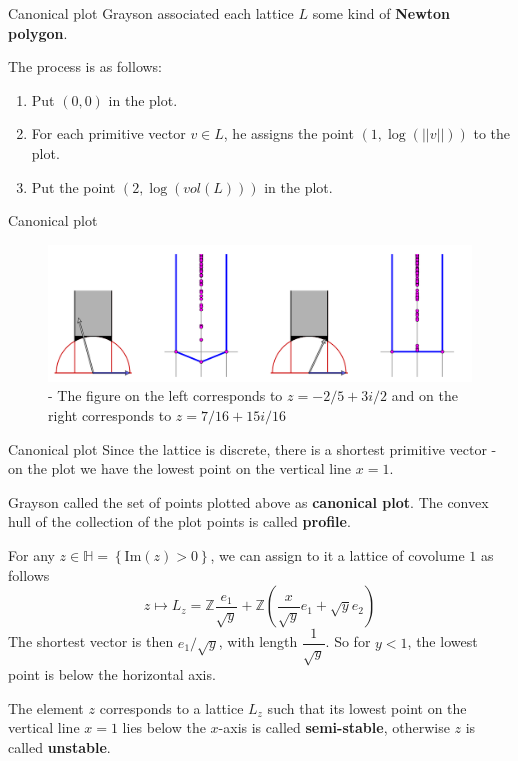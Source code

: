 \documentclass[pdf]{beamer}
\begin{document}
\begin{frame}{Canonical plot}
    Grayson associated each lattice $L$  some kind of \textbf{Newton polygon}. \pause

    The process is as follows:
    \begin{enumerate}
        \item Put $(0,0)$ in the plot.
        \item For each primitive vector $v \in L$, he assigns the point $(1,\log(||v||))$ to the plot.
        \item Put the point $(2,\log(vol(L)))$ in the plot.
    \end{enumerate}
\end{frame}
\begin{frame}{Canonical plot}
    \begin{figure}[h]
        \includegraphics[width = \textwidth]{Canonical plot.png}
        \caption{\cite{casselman2004stability} - The figure on the left corresponds to $z = -2/5 +3i/2$ and on the right corresponds to $z = 7/16+15i/16$ }
    \end{figure}
\end{frame}
\begin{frame}{Canonical plot}
    Since the lattice is discrete, there is a shortest primitive vector - on the plot we have the lowest point on the vertical line $x=1$.\pause\vspace{3em}

    Grayson called the set of points plotted above as \textbf{canonical plot}. The convex hull of the collection
    of the plot points is called \textbf{profile}.
\end{frame}
\begin{frame}
    For any $z \in \mathbb{H} = \left\lbrace \text{Im}(z)>0 \right\rbrace$, we can assign to it a lattice of covolume $1$ as follows
    \[z \mapsto L_z = \mathbb{Z}\dfrac{e_1}{\sqrt{y}} + \mathbb{Z}\left(\dfrac{x}{\sqrt{y}}e_1+\sqrt{y}e_2 \right)\]
    The shortest vector is then $ e_1/\sqrt{y}$, with length $\dfrac{1}{\sqrt{y}}$. So for $y<1$, the lowest
    point is below the horizontal axis.
    \pause \vspace{2em}

    The element $z$ corresponds to a lattice $L_z$ such that its lowest point on the
    vertical line $x=1$ lies below the $x$-axis is called \textbf{semi-stable}, otherwise $z$ is called \textbf{unstable}.
\end{frame}
\end{document}
